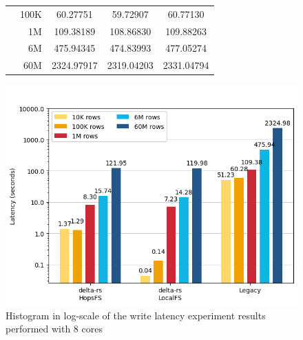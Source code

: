 \begin{figure}
\begin{minipage}[b]{\textwidth}
\begin{tabular}{c r S[table-format=5.5] S[table-format=5.5] S[table-format=5.5]}
                                      & 100K &    60.27751 &   59.72907 &   60.77130\\ 
                                      & 1M   &   109.38189 &  108.86830 &  109.88263\\
                                      & 6M   &   475.94345 &  474.83993 &  477.05274\\
                                      & 60M  &  2324.97917 & 2319.04203 & 2331.04794\\
            \bottomrule
        \end{tabular}
    \end{minipage}
    \begin{minipage}[b]{\textwidth}
        \centering
        \includegraphics[width=\textwidth]{figures/99-appendix/results-diagrams/write/write_time_8_core.png}
        \caption{Histogram in log-scale of the write latency experiment results performed with 8  cores}
        \label{fig:appx_res_write_time_8_cores}
    \end{minipage}
\end{figure}


